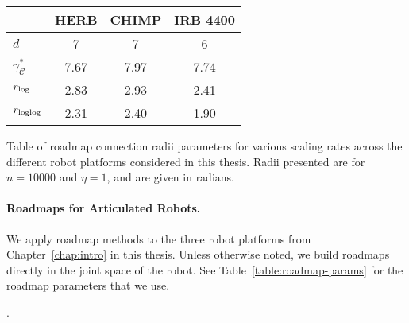 \begin{margintable}
   \centering
   {\renewcommand{\tabcolsep}{0.15cm}
   \begin{tabular}{lccc}
      \toprule
      & HERB & CHIMP & IRB 4400 \\
      \midrule
      $d$ & 7 & 7 & 6 \\
      $\gamma^*_{\mathcal{C}}$ & 7.67 & 7.97 & 7.74 \\
      $r_{\mbox{\scriptsize log}}$ & 2.83 & 2.93 & 2.41 \\
      $r_{\mbox{\scriptsize loglog}}$ & 2.31 & 2.40 & 1.90 \\
      \bottomrule
   \end{tabular}
   }
   \vspace{0.1cm}
   \caption{Table of roadmap connection radii parameters for
      various scaling rates across the different robot platforms
      considered in this thesis.
      Radii presented are for $n=10000$ and $\eta = 1$,
      and are given in radians.}
   \label{table:roadmap-params}
\end{margintable}

\paragraph{Roadmaps for Articulated Robots.}
We apply roadmap methods to the three robot platforms
from Chapter~\ref{chap:intro} in this thesis.
Unless otherwise noted,
we build roadmaps directly in the joint space of the robot.
See Table~\ref{table:roadmap-params} for the roadmap parameters
that we use.

.

%
%
%
%

